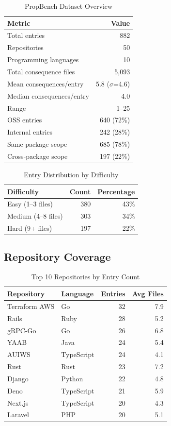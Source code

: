 \documentclass[sigconf,nonacm]{acmart}
\begin{document}
\begin{table}[h]
\caption{PropBench Dataset Overview}
\label{tab:overview}
\begin{tabular}{lr}
\toprule
\textbf{Metric} & \textbf{Value} \\
\midrule
Total entries & 882 \\
Repositories & 50 \\
Programming languages & 10 \\
Total consequence files & 5{,}093 \\
Mean consequences/entry & 5.8 ($\sigma$=4.6) \\
Median consequences/entry & 4.0 \\
Range & 1--25 \\
OSS entries & 640 (72\%) \\
Internal entries & 242 (28\%) \\
Same-package scope & 685 (78\%) \\
Cross-package scope & 197 (22\%) \\
\bottomrule
\end{tabular}
\end{table}

\begin{table}[h]
\caption{Entry Distribution by Difficulty}
\label{tab:difficulty}
\begin{tabular}{lrr}
\toprule
\textbf{Difficulty} & \textbf{Count} & \textbf{Percentage} \\
\midrule
Easy (1--3 files) & 380 & 43\% \\
Medium (4--8 files) & 303 & 34\% \\
Hard (9+ files) & 197 & 22\% \\
\bottomrule
\end{tabular}
\end{table}

\subsection{Repository Coverage}

\begin{table}[h]
\caption{Top 10 Repositories by Entry Count}
\label{tab:repos}
\begin{tabular}{llrr}
\toprule
\textbf{Repository} & \textbf{Language} & \textbf{Entries} & \textbf{Avg Files} \\
\midrule
Terraform AWS & Go & 32 & 7.9 \\
Rails & Ruby & 28 & 5.2 \\
gRPC-Go & Go & 26 & 6.8 \\
YAAB & Java & 24 & 5.4 \\
AUIWS & TypeScript & 24 & 4.1 \\
Rust & Rust & 23 & 7.2 \\
Django & Python & 22 & 4.8 \\
Deno & TypeScript & 21 & 5.9 \\
Next.js & TypeScript & 20 & 4.3 \\
Laravel & PHP & 20 & 5.1 \\
\bottomrule
\end{tabular}
\end{table}
\end{document}
